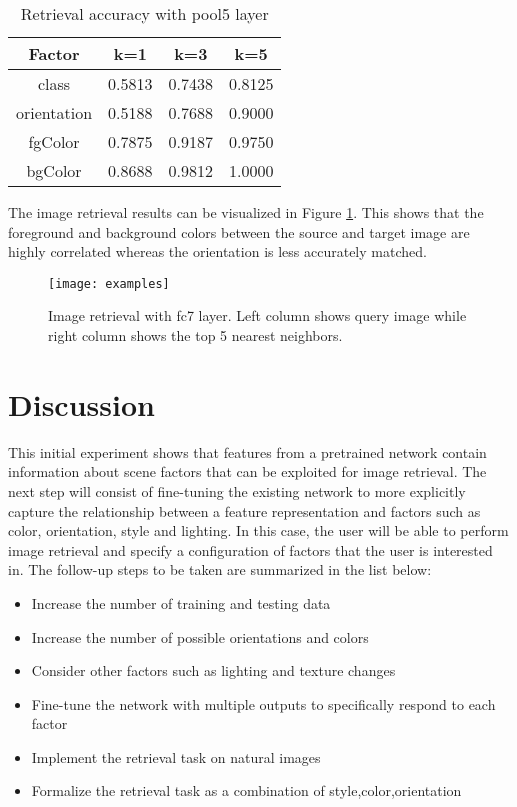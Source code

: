 \documentclass[twoside,10pt]{article}
\newcommand{\imsize}{0.9\linewidth}
\begin{document}
\begin{table}[h!]
\centering
\begin{tabular}{c|ccc}
Factor & k=1 & k=3 & k=5\\
\hline
class & 0.5813 & 0.7438 & 0.8125\\
orientation & 0.5188 & 0.7688 & 0.9000\\
fgColor & 0.7875 & 0.9187 & 0.9750\\
bgColor & 0.8688 & 0.9812 & 1.0000\\
\end{tabular}
\caption{Retrieval accuracy with pool5 layer\label{table:acc6}}
\end{table}

The image retrieval results can be visualized in Figure \ref{fig:retrieval}. This shows that the foreground and background colors
between the source and target image are highly correlated whereas the orientation is less accurately matched.

\begin{figure}[h!]
\centering
\texttt{[image: examples]}
\caption{Image retrieval with fc7 layer. Left column shows query image while right column shows the top 5 nearest neighbors.\label{fig:retrieval}}
\end{figure}

\section{Discussion}

This initial experiment shows that features from a pretrained network contain information about scene factors that can be exploited for image retrieval.
The next step will consist of fine-tuning the existing network to more explicitly capture the relationship between a feature representation
and factors such as color, orientation, style and lighting.
In this case, the user will be able to perform image retrieval and specify a configuration of factors that the user is interested in.
The follow-up steps to be taken are summarized in the list below:

\begin{itemize}
	\item Increase the number of training and testing data
	\item Increase the number of possible orientations and colors
	\item Consider other factors such as lighting and texture changes
	\item Fine-tune the network with multiple outputs to specifically respond to each factor
	\item Implement the retrieval task on natural images
	\item Formalize the retrieval task as a combination of style,color,orientation
\end{itemize}



\end{document}
